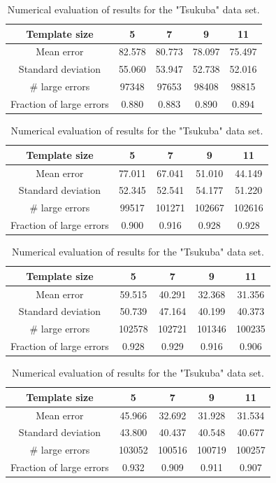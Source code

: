 \documentclass[12pt,a4paper,oneside,final]{article}
\begin{document}
\begin{table}[H]
	\centering
	\begin{subtable}{1\textwidth}
		\centering
		\begin{tabular}{c||c|c|c|c}
			Template size &5&7&9&11\\\hline
			Mean error &82.578&80.773&78.097&75.497\\\hline
			Standard deviation &55.060&53.947&52.738&52.016\\\hline
			\# large errors &97348&97653&98408&98815\\\hline
			Fraction of large errors &0.880&0.883&0.890&0.894\\\hline
		\end{tabular}
		\caption{Calculated with 1 scale level.}
	\end{subtable}
	\begin{subtable}{1\textwidth}
		\centering
		\begin{tabular}{c||c|c|c|c}
			Template size &5&7&9&11\\\hline
			Mean error &77.011&67.041&51.010&44.149\\\hline
			Standard deviation &52.345&52.541&54.177&51.220\\\hline
			\# large errors &99517&101271&102667&102616\\\hline
			Fraction of large errors &0.900&0.916&0.928&0.928\\\hline
		\end{tabular}
		\caption{Calculated with 2 scale levels.}
	\end{subtable}
	\begin{subtable}{1\textwidth}
		\centering
		\begin{tabular}{c||c|c|c|c}
			Template size &5&7&9&11\\\hline
			Mean error &59.515&40.291&32.368&31.356\\\hline
			Standard deviation &50.739&47.164&40.199&40.373\\\hline
			\# large errors &102578&102721&101346&100235\\\hline
			Fraction of large errors &0.928&0.929&0.916&0.906\\\hline
		\end{tabular}
		\caption{Calculated with 3 scale levels.}
	\end{subtable}
	\begin{subtable}{1\textwidth}
		\centering
		\begin{tabular}{c||c|c|c|c}
			Template size &5&7&9&11\\\hline
			Mean error &45.966&32.692&31.928&31.534\\\hline
			Standard deviation &43.800&40.437&40.548&40.677\\\hline
			\# large errors &103052&100516&100719&100257\\\hline
			Fraction of large errors &0.932&0.909&0.911&0.907\\\hline
		\end{tabular}
		\caption{Calculated with 4 scale levels.}
	\end{subtable}
	\caption{Numerical evaluation of results for the "Tsukuba" data set.}
	\label{tab:numeval}
\end{table}
\end{document}
